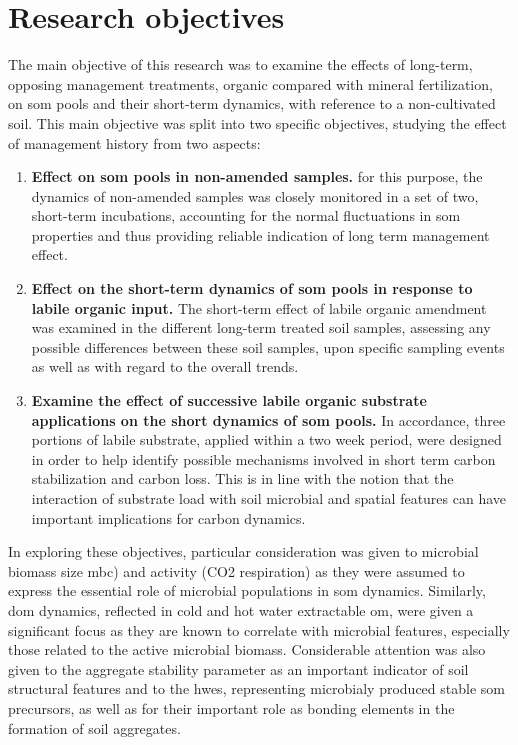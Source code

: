 \section{Research objectives}

	The main objective of this research was to examine the effects of long-term, opposing management treatments, organic compared with mineral fertilization, on \gls{som} pools and their short-term dynamics, with reference to a non-cultivated soil.
	This main objective was split into two specific objectives, studying the effect of management history from two aspects:
	\begin{enumerate}
		\item \textbf{Effect on \gls{som} pools in non-amended samples.} for this purpose, the dynamics of non-amended samples was closely monitored in a set of two, short-term incubations, accounting for the normal fluctuations in \gls{som} properties and thus providing reliable indication of long term management effect.
		\item \textbf{Effect on the short-term dynamics of \gls{som} pools in response to labile organic input.} The short-term effect of labile organic amendment was examined in the different long-term treated soil samples, assessing any possible differences between these soil samples, upon specific sampling events as well as with regard to the overall trends.


		\item \textbf{Examine the effect of successive labile organic substrate applications on the short dynamics of \gls{som} pools.} In accordance, three portions of labile substrate, applied within a two week period, were designed in  order to help identify possible mechanisms involved in short term carbon stabilization and carbon loss. This is in line with the notion that the interaction of substrate load with soil microbial and spatial features can have important implications for carbon dynamics.
	\end{enumerate}
	In exploring these objectives, particular consideration was given to microbial biomass size \gls{mbc})  and activity (CO2 respiration) as they were assumed to express the essential role of microbial populations in \gls{som} dynamics. Similarly, \gls{dom} dynamics, reflected in cold and hot water extractable \gls{om}, were given a significant focus as they are known to correlate with microbial features, especially those related to the active microbial biomass.  Considerable attention was also given to the aggregate stability parameter as an important indicator of soil structural features and to the \gls{hwes}, representing microbialy produced stable \gls{som} precursors, as well as for their important role as bonding elements in the formation of soil aggregates.

